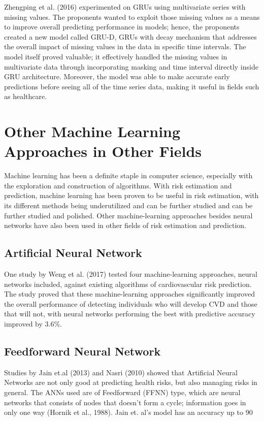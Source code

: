 \documentclass[10pt,11pt,12pt,oneside]{book}
\begin{document}
        Zhengping et al. (2016) experimented on GRUs using multivariate series with missing values. The proponents wanted to exploit those missing values as a means to improve overall predicting performance in models; hence, the proponents created a new model called GRU-D, GRUs with decay mechanism that addresses the overall impact of missing values in the data in specific time intervals. The model itself proved valuable; it effectively handled the missing values in multivariate data through incorporating masking and time interval directly inside GRU architecture. Moreover, the model was able to make accurate early predictions before seeing all of the time series data, making it useful in fields such as healthcare. \cite{DBLP:journals/corr/ChePCSL16}
    \section{Other Machine Learning Approaches in Other Fields}
    Machine learning has been a definite staple in computer science, especially with the exploration and construction of algorithms. With risk estimation and prediction, machine learning has been proven to be useful in risk estimation, with its different methods being underutilized and can be further studied and can be further studied and polished. \cite{Kruppa2012} Other machine-learning approaches besides neural networks have also been used in other fields of risk estimation and prediction. 
        \subsection{Artificial Neural Network}
        One study by Weng et al. (2017) tested four machine-learning approaches, neural networks included, against existing algorithms of cardiovascular risk prediction. The study proved that these machine-learning approaches significantly improved the overall performance of detecting individuals who will develop CVD and those that will not, with neural networks performing the best with predictive accuracy improved by 3.6\%. \cite{Weng2017}

        \subsection{Feedforward Neural Network}
        Studies by Jain et.al (2013) and Nasri (2010) showed that Artificial Neural Networks are not only good at predicting health risks, but also managing risks in general. The ANNs used are of Feedforward (FFNN) type, which are neural networks that consists of nodes that doesn’t form a cycle; information goes in only one way (Hornik et al., 1988). Jain et. al’s model has an accuracy up to 90%
\end{document}
